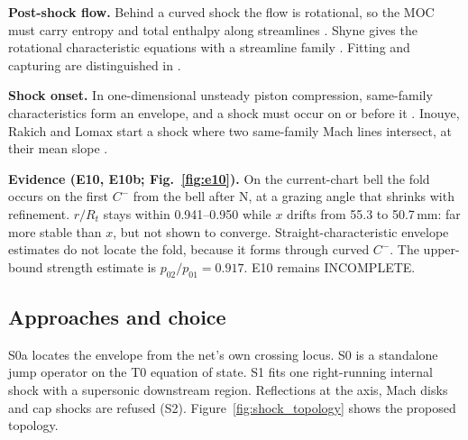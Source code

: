 \textbf{Post-shock flow.} Behind a curved shock the flow is rotational, so the MOC
must carry entropy and total enthalpy along streamlines
\cite[PDF pp.~423--424, Sec.~11.9]{anderson}. Shyne gives the rotational
characteristic equations with a streamline family
\cite[PDF p.~33, printed p.~28, Eqs.~58--62]{shyne1988}\cite[PDF pp.~8--9]{shyne1990}.
Fitting and capturing are distinguished in \cite[PDF p.~438, Sec.~11.15]{anderson}.

\textbf{Shock onset.} In one-dimensional unsteady piston compression, same-family
characteristics form an envelope, and a shock must occur on or before it
\cite[Sec.~16, p.~40; Sec.~24, pp.~58--59]{courant1944}. Inouye, Rakich and Lomax
start a shock where two same-family Mach lines intersect, at their mean slope
\cite[PDF pp.~12--14, printed pp.~10--12]{inouye1965}.

\textbf{Evidence (E10, E10b; Fig.~\ref{fig:e10}).} On the current-chart bell the fold
occurs on the first $C^-$ from the bell after N, at a grazing angle that shrinks with
refinement. $r/R_t$ stays within 0.941--0.950 while $x$ drifts from 55.3 to 50.7\,mm:
far more stable than $x$, but not shown to converge. Straight-characteristic envelope
estimates do not locate the fold, because it forms through curved $C^-$. The
upper-bound strength estimate is $p_{02}/p_{01}=0.917$. E10 remains INCOMPLETE.

\subsection{Approaches and choice}
\begingroup\footnotesize
\par{}\addvspace{\LTpost}
\endgroup
S0a locates the envelope from the net's own crossing locus. S0 is a standalone jump
operator on the T0 equation of state. S1 fits one right-running internal shock with a
supersonic downstream region. Reflections at the axis, Mach disks and cap shocks are
refused (S2). Figure~\ref{fig:shock_topology} shows the proposed topology.

